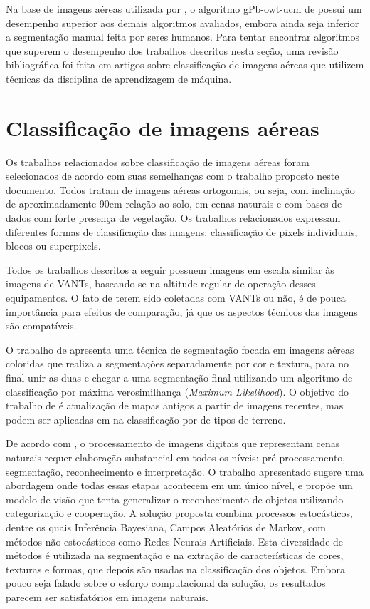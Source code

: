 Na base de imagens aéreas utilizada por , o algoritmo gPb-owt-ucm de  possui um desempenho superior aos demais algoritmos avaliados, embora ainda seja inferior a segmentação manual feita por seres humanos. Para tentar encontrar algoritmos que superem o desempenho dos trabalhos descritos nesta seção, uma revisão bibliográfica foi feita em artigos sobre classificação de imagens aéreas que utilizem técnicas da disciplina de aprendizagem de máquina.

\section{Classificação de imagens aéreas}\label{sec:trClassificacao}

Os trabalhos relacionados sobre classificação de imagens aéreas foram selecionados de acordo com suas semelhanças com o trabalho proposto neste documento. Todos tratam de imagens aéreas ortogonais, ou seja, com inclinação de aproximadamente 90\degree em relação ao solo, em cenas naturais e com bases de dados com forte presença de vegetação. Os trabalhos relacionados expressam diferentes formas de classificação das imagens: classificação de pixels individuais, blocos ou superpixels.

Todos os trabalhos descritos a seguir possuem imagens em escala similar às imagens de VANTs, baseando-se na altitude regular de operação desses equipamentos. O fato de terem sido coletadas com VANTs ou não, é de pouca importância para efeitos de comparação, já que os aspectos técnicos das imagens são compatíveis.

O trabalho de  apresenta uma técnica de segmentação focada em imagens aéreas coloridas que realiza a segmentações separadamente por cor e textura, para no final unir as duas e chegar a uma segmentação final utilizando um algoritmo de classificação por máxima verosimilhança (\textit{Maximum Likelihood}). O objetivo do trabalho de  é atualização de mapas antigos a partir de imagens recentes, mas podem ser aplicadas em na classificação por de tipos de terreno.

De acordo com , o processamento de imagens digitais que representam cenas naturais requer elaboração substancial em todos os níveis: pré-processamento, segmentação, reconhecimento e interpretação. O trabalho apresentado sugere uma abordagem onde todas essas etapas acontecem em um único nível, e propõe um modelo de visão que tenta generalizar o reconhecimento de objetos utilizando categorização e cooperação.  A solução proposta combina processos estocásticos, dentre os quais Inferência Bayesiana, Campos Aleatórios de Markov, com métodos não estocásticos como Redes Neurais Artificiais. Esta diversidade de métodos é utilizada na segmentação e na extração de características de cores, texturas e formas, que depois são usadas na classificação dos objetos. Embora pouco seja falado sobre o esforço computacional da solução, os resultados parecem ser satisfatórios em imagens naturais.

